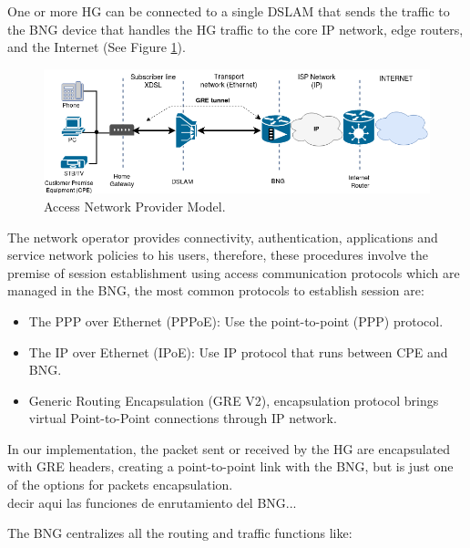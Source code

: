  One or more HG can be connected to a single DSLAM that sends the traffic to the BNG device that handles the HG traffic to the core IP network, edge routers, and the Internet (See Figure \ref{fig:arch}).\\
 \begin{figure}[!h]
 	\centering
 	\includegraphics[width=0.8\linewidth]{figures/bng_architect.png}
 	\caption{Access Network Provider Model.}
 	\label{fig:arch}
\end{figure}
The network operator provides connectivity, authentication, applications and service network  policies to his users, therefore, these procedures involve the premise of session establishment using access communication protocols which are managed in the BNG, the most common protocols to establish session are:
\begin{itemize}
\item The PPP over Ethernet (PPPoE): Use the point-to-point (PPP) protocol.
\item The IP over Ethernet (IPoE): Use IP protocol that runs between CPE and BNG.
\item Generic Routing Encapsulation (GRE V2), encapsulation protocol brings virtual  Point-to-Point connections through IP network.
\end{itemize}
In our implementation, the packet sent or received by the HG are encapsulated with GRE headers, creating a point-to-point link with the BNG, but is just one of the options for packets encapsulation. \\


decir aqui las funciones de enrutamiento del BNG...

The BNG centralizes all the routing and traffic functions like:

